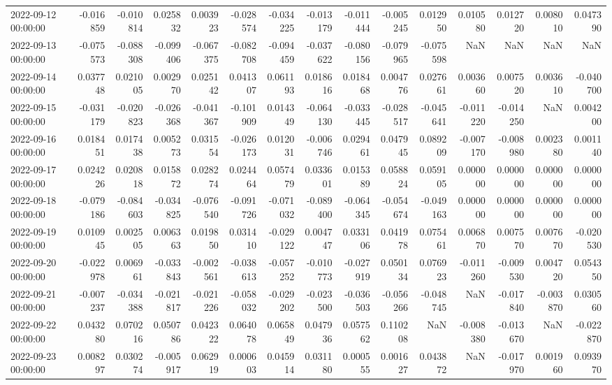 \begin{tabular}{lrrrrrrrrrrrrrr}
2022-09-12 00:00:00 & -0.016859 & -0.010814 & 0.025832 & 0.003923 & -0.028574 & -0.034225 & -0.013179 & -0.011444 & -0.005245 & 0.012950 & 0.010580 & 0.012720 & 0.008010 & 0.047390 \\
2022-09-13 00:00:00 & -0.075573 & -0.088308 & -0.099406 & -0.067375 & -0.082708 & -0.094459 & -0.037622 & -0.080156 & -0.079965 & -0.075598 & NaN & NaN & NaN & NaN \\
2022-09-14 00:00:00 & 0.037748 & 0.021005 & 0.002970 & 0.025142 & 0.041307 & 0.061193 & 0.018616 & 0.018468 & 0.004776 & 0.027661 & 0.003660 & 0.007520 & 0.003610 & -0.040700 \\
2022-09-15 00:00:00 & -0.031179 & -0.020823 & -0.026368 & -0.041367 & -0.101909 & 0.014349 & -0.064130 & -0.033445 & -0.028517 & -0.045641 & -0.011220 & -0.014250 & NaN & 0.004200 \\
2022-09-16 00:00:00 & 0.018451 & 0.017438 & 0.005273 & 0.031554 & -0.026173 & 0.012031 & -0.006746 & 0.029461 & 0.047945 & 0.089209 & -0.007170 & -0.008980 & 0.002380 & 0.001140 \\
2022-09-17 00:00:00 & 0.024226 & 0.020818 & 0.015872 & 0.028274 & 0.024464 & 0.057479 & 0.033601 & 0.015389 & 0.058824 & 0.059105 & 0.000000 & 0.000000 & 0.000000 & 0.000000 \\
2022-09-18 00:00:00 & -0.079186 & -0.084603 & -0.034825 & -0.076540 & -0.091726 & -0.071032 & -0.089400 & -0.064345 & -0.054674 & -0.049163 & 0.000000 & 0.000000 & 0.000000 & 0.000000 \\
2022-09-19 00:00:00 & 0.010945 & 0.002505 & 0.006363 & 0.019850 & 0.031410 & -0.029122 & 0.004747 & 0.033106 & 0.041978 & 0.075461 & 0.006870 & 0.007570 & 0.007670 & -0.020530 \\
2022-09-20 00:00:00 & -0.022978 & 0.006961 & -0.033843 & -0.002561 & -0.038613 & -0.057252 & -0.010773 & -0.027919 & 0.050134 & 0.076923 & -0.011260 & -0.009530 & 0.004720 & 0.054350 \\
2022-09-21 00:00:00 & -0.007237 & -0.034388 & -0.021817 & -0.021226 & -0.058032 & -0.029202 & -0.023500 & -0.036503 & -0.056266 & -0.048745 & NaN & -0.017840 & -0.003870 & 0.030560 \\
2022-09-22 00:00:00 & 0.043280 & 0.070216 & 0.050786 & 0.042322 & 0.064078 & 0.065849 & 0.047936 & 0.057562 & 0.110208 & NaN & -0.008380 & -0.013670 & NaN & -0.022870 \\
2022-09-23 00:00:00 & 0.008297 & 0.030274 & -0.005917 & 0.062919 & 0.000603 & 0.045914 & 0.031180 & 0.000555 & 0.001627 & 0.043872 & NaN & -0.017970 & 0.001960 & 0.093970 \\

\end{tabular}
